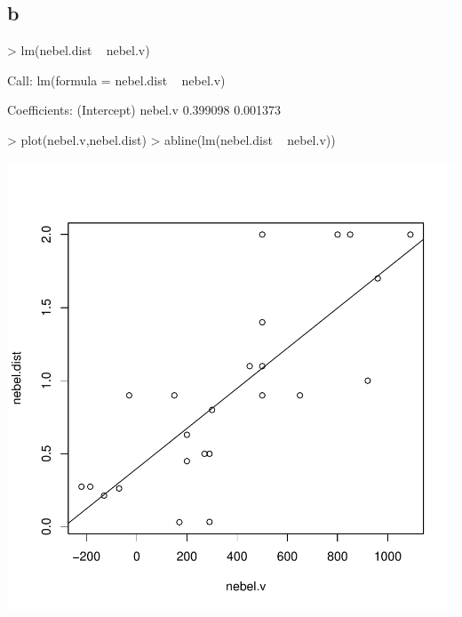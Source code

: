 \subsection{b}
\begin{Schunk}
\begin{Sinput}
> lm(nebel.dist ~ nebel.v)
\end{Sinput}
\begin{Soutput}
Call:
lm(formula = nebel.dist ~ nebel.v)

Coefficients:
(Intercept)      nebel.v  
   0.399098     0.001373  
\end{Soutput}
\begin{Sinput}
> plot(nebel.v,nebel.dist)
> abline(lm(nebel.dist ~ nebel.v))
\end{Sinput}
\end{Schunk}
\includegraphics{sw10_6-003}

